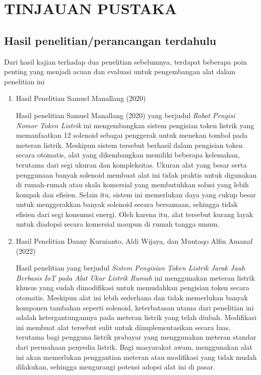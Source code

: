 \chapter{TINJAUAN PUSTAKA}

\section{Hasil penelitian/perancangan terdahulu}
Dari hasil kajian terhadap dua penelitian sebelumnya, terdapat beberapa poin penting yang menjadi acuan dan evaluasi untuk pengembangan alat dalam penelitian ini

\begin{enumerate}
    \item Hasil Penelitian Samuel Manallang (2020)
    
    Hasil penelitian Samuel Manallang (2020) yang berjudul \textit{Robot Pengisi Nomor Token Listrik} ini mengembangkan sistem pengisian token listrik yang memanfaatkan 12 solenoid sebagai penggerak untuk menekan tombol pada meteran listrik. Meskipun sistem tersebut berhasil dalam pengisian token secara otomatis, alat yang dikembangkan memiliki beberapa kelemahan, terutama dari segi ukuran dan kompleksitas. Ukuran alat yang besar serta penggunaan banyak solenoid membuat alat ini tidak praktis untuk digunakan di rumah-rumah atau skala komersial yang membutuhkan solusi yang lebih kompak dan efisien. Selain itu, sistem ini memerlukan daya yang cukup besar untuk menggerakkan banyak solenoid secara bersamaan, sehingga tidak efisien dari segi konsumsi energi. Oleh karena itu, alat tersebut kurang layak untuk diadopsi secara komersial maupun di rumah tangga umum. \parencite{manullang}

    \item Hasil Penelitian Danny Kurnianto, Aldi Wijaya, dan Muntaqo Alfin Amanaf (2022)

    Hasil penelitian yang berjudul \textit{Sistem Pengisian Token Listrik Jarak Jauh Berbasis IoT pada Alat Ukur Listrik Rumah} ini menggunakan meteran listrik khusus yang sudah dimodifikasi untuk memudahkan pengisian token secara otomatis. Meskipun alat ini lebih sederhana dan tidak memerlukan banyak komponen tambahan seperti solenoid, keterbatasan utama dari penelitian ini adalah ketergantungannya pada meteran listrik yang telah diubah. Modifikasi ini membuat alat tersebut sulit untuk diimplementasikan secara luas, terutama bagi pengguna listrik prabayar yang menggunakan meteran standar dari perusahaan penyedia listrik. Bagi masyarakat awam, menggunakan alat ini akan memerlukan penggantian meteran atau modifikasi yang tidak mudah dilakukan, sehingga mengurangi potensi adopsi alat ini di pasar. \parencite{kurnianto}
\end{enumerate}

